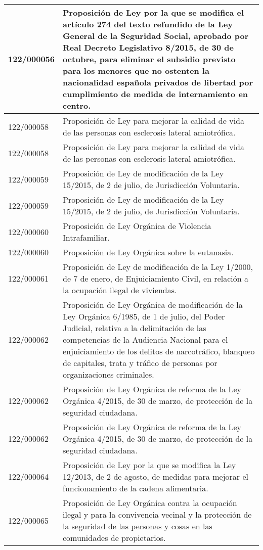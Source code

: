 {\begin{table}[H]
\begin{center}
\begin{tabularx}{\linewidth}{| l | X |}
\hline
122/000056 & Proposición de Ley por la que se modifica el artículo 274 del texto refundido de la Ley General de la Seguridad Social, aprobado por Real Decreto Legislativo 8/2015, de 30 de octubre, para eliminar el subsidio previsto para los menores que no ostenten la nacionalidad española privados de libertad por cumplimiento de medida de internamiento en centro. \\
\hline
122/000058 & Proposición de Ley para mejorar la calidad de vida de las personas con esclerosis lateral amiotrófica. \\
\hline
122/000058 & Proposición de Ley para mejorar la calidad de vida de las personas con esclerosis lateral amiotrófica. \\
\hline
122/000059 & Proposición de Ley de modificación de la Ley 15/2015, de 2 de julio, de Jurisdicción Voluntaria. \\
\hline
122/000059 & Proposición de Ley de modificación de la Ley 15/2015, de 2 de julio, de Jurisdicción Voluntaria. \\
\hline
122/000060 & Proposición de Ley Orgánica de Violencia Intrafamiliar. \\
\hline
122/000060 & Proposición de Ley Orgánica sobre la eutanasia. \\
\hline
122/000061 & Proposición de Ley de modificación de la Ley 1/2000, de 7 de enero, de Enjuiciamiento Civil, en relación a la ocupación ilegal de viviendas. \\
\hline
122/000062 & Proposición de Ley Orgánica de modificación de la Ley Orgánica 6/1985, de 1 de julio, del Poder Judicial, relativa a la delimitación de las competencias de la Audiencia Nacional para el enjuiciamiento de los delitos de narcotráfico, blanqueo de capitales, trata y tráfico de personas por organizaciones criminales. \\
\hline
122/000062 & Proposición de Ley Orgánica de reforma de la Ley Orgánica 4/2015, de 30 de marzo, de protección de la seguridad ciudadana. \\
\hline
122/000062 & Proposición de Ley Orgánica de reforma de la Ley Orgánica 4/2015, de 30 de marzo, de protección de la seguridad ciudadana. \\
\hline
122/000064 & Proposición de Ley por la que se modifica la Ley 12/2013, de 2 de agosto, de medidas para mejorar el funcionamiento de la cadena alimentaria. \\
\hline
122/000065 & Proposición de Ley Orgánica contra la ocupación ilegal y para la convivencia vecinal y la protección de la seguridad de las personas y cosas en las comunidades de propietarios. \\

\end{tabularx}
\end{center}
\end{table}}
